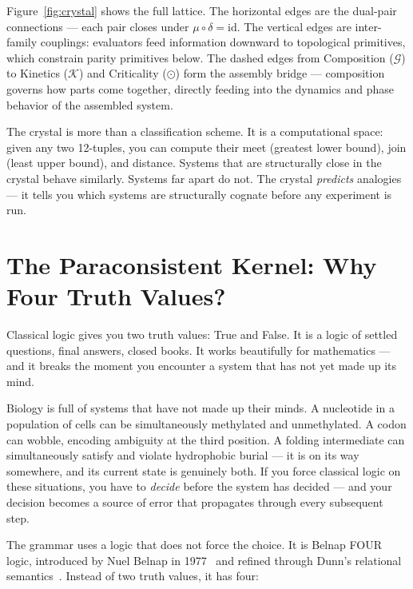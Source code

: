 \documentclass[11pt,a4paper,twocolumn]{article}
\begin{document}
Figure~\ref{fig:crystal} shows the full lattice. The horizontal edges are the dual-pair connections — each pair closes under $\mu \circ \delta = \text{id}$. The vertical edges are inter-family couplings: evaluators feed information downward to topological primitives, which constrain parity primitives below. The dashed edges from Composition ($\mathcal{G}$) to Kinetics ($\mathcal{K}$) and Criticality ($\odot$) form the assembly bridge — composition governs how parts come together, directly feeding into the dynamics and phase behavior of the assembled system.

The crystal is more than a classification scheme. It is a computational space: given any two 12-tuples, you can compute their meet (greatest lower bound), join (least upper bound), and distance. Systems that are structurally close in the crystal behave similarly. Systems far apart do not. The crystal \emph{predicts} analogies — it tells you which systems are structurally cognate before any experiment is run.

\section{The Paraconsistent Kernel: Why Four Truth Values?}

Classical logic gives you two truth values: True and False. It is a logic of settled questions, final answers, closed books. It works beautifully for mathematics — and it breaks the moment you encounter a system that has not yet made up its mind.

Biology is full of systems that have not made up their minds. A nucleotide in a population of cells can be simultaneously methylated and unmethylated. A codon can wobble, encoding ambiguity at the third position. A folding intermediate can simultaneously satisfy and violate hydrophobic burial — it is on its way somewhere, and its current state is genuinely both. If you force classical logic on these situations, you have to \emph{decide} before the system has decided — and your decision becomes a source of error that propagates through every subsequent step.

The grammar uses a logic that does not force the choice. It is Belnap FOUR logic, introduced by Nuel Belnap in 1977~\cite{belnap1977} and refined through Dunn's relational semantics~\cite{dunn1976}. Instead of two truth values, it has four:
\end{document}
